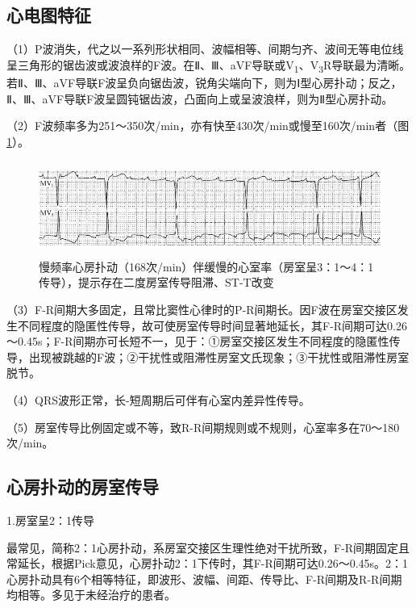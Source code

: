 \protect\hypertarget{text00020.htmlux5cux23subid194}{}{}

\subsection{心电图特征}

（1）P波消失，代之以一系列形状相同、波幅相等、间期匀齐、波间无等电位线呈三角形的锯齿波或波浪样的F波。在Ⅱ、Ⅲ、aVF导联或V\textsubscript{1}、V\textsubscript{3}R导联最为清晰。若Ⅱ、Ⅲ、aVF导联F波呈负向锯齿波，锐角尖端向下，则为Ⅰ型心房扑动；反之，Ⅱ、Ⅲ、aVF导联F波呈圆钝锯齿波，凸面向上或呈波浪样，则为Ⅱ型心房扑动。

（2）F波频率多为251～350次/min，亦有快至430次/min或慢至160次/min者（图\ref{fig13-6}）。

\begin{figure}[!htbp]
 \centering
 \includegraphics[width=5.58333in,height=1.21875in]{./images/Image00214.jpg}
 \captionsetup{justification=centering}
 \caption{慢频率心房扑动（168次/min）伴缓慢的心室率（房室呈3：1～4：1传导），提示存在二度房室传导阻滞、ST-T改变}
 \label{fig13-6}
  \end{figure} 

（3）F-R间期大多固定，且常比窦性心律时的P-R间期长。因F波在房室交接区发生不同程度的隐匿性传导，故可使房室传导时间显著地延长，其F-R间期可达0.26～0.45s；F-R间期亦可长短不一，见于：①房室交接区发生不同程度的隐匿性传导，出现被跳越的F波；②干扰性或阻滞性房室文氏现象；③干扰性或阻滞性房室脱节。

（4）QRS波形正常，长-短周期后可伴有心室内差异性传导。

（5）房室传导比例固定或不等，致R-R间期规则或不规则，心室率多在70～180次/min。

\protect\hypertarget{text00020.htmlux5cux23subid195}{}{}

\subsection{心房扑动的房室传导}

1.房室呈2：1传导

最常见，简称2：1心房扑动，系房室交接区生理性绝对干扰所致，F-R间期固定且常延长，根据Pick意见，心房扑动2：1下传时，其F-R间期可达0.26～0.45s。2：1心房扑动具有6个相等特征，即波形、波幅、间距、传导比、F-R间期及R-R间期均相等。多见于未经治疗的患者。

